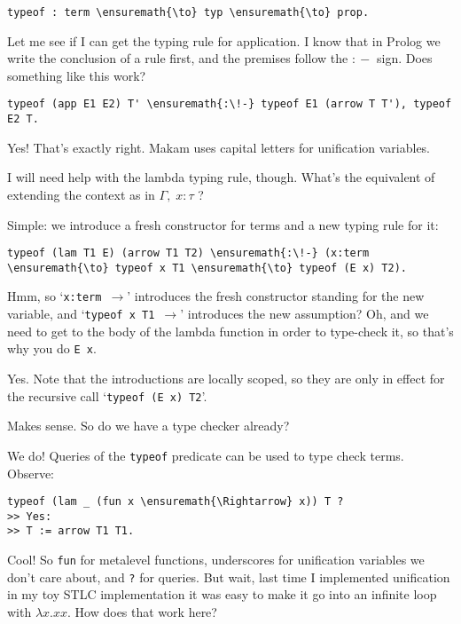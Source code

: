 \begin{verbatim}
typeof : term \ensuremath{\to} typ \ensuremath{\to} prop.
\end{verbatim}

\heroSTUDENT{} Let me see if I can get the typing rule for application. I know
that in Prolog we write the conclusion of a rule first, and the premises
follow the \texttt{\ensuremath{:\!-}} sign. Does something like this work?

\begin{verbatim}
typeof (app E1 E2) T' \ensuremath{:\!-} typeof E1 (arrow T T'), typeof E2 T.
\end{verbatim}

\heroADVISOR{} Yes! That's exactly right. Makam uses capital letters for
unification variables.

\heroSTUDENT{} I will need help with the lambda typing rule, though. What's
the equivalent of extending the context as in \(\Gamma, \; x : \tau\) ?

\heroADVISOR{} Simple: we introduce a fresh constructor for terms and a new
typing rule for it:

\begin{verbatim}
typeof (lam T1 E) (arrow T1 T2) \ensuremath{:\!-} (x:term \ensuremath{\to} typeof x T1 \ensuremath{\to} typeof (E x) T2).
\end{verbatim}

\heroSTUDENT{} Hmm, so `\texttt{x:term\ \ensuremath{\to}}' introduces the fresh
constructor standing for the new variable, and
`\texttt{typeof\ x\ T1\ \ensuremath{\to}}' introduces the new assumption?
Oh, and we need to get to the body of the lambda function in order to
type-check it, so that's why you do \texttt{E\ x}.

\heroADVISOR{} Yes. Note that the introductions are locally scoped, so they
are only in effect for the recursive call `\texttt{typeof\ (E\ x)\ T2}'.

\heroSTUDENT{} Makes sense. So do we have a type checker already?

\heroADVISOR{} We do! Queries of the \texttt{typeof} predicate can be used to
type check terms. Observe:

\begin{verbatim}
typeof (lam _ (fun x \ensuremath{\Rightarrow} x)) T ?
>> Yes:
>> T := arrow T1 T1.
\end{verbatim}

\heroSTUDENT{} Cool! So \texttt{fun} for metalevel functions, underscores for
unification variables we don't care about, and \texttt{?} for queries.
But wait, last time I implemented unification in my toy STLC
implementation it was easy to make it go into an infinite loop with
\(\lambda x. x x\). How does that work here?

